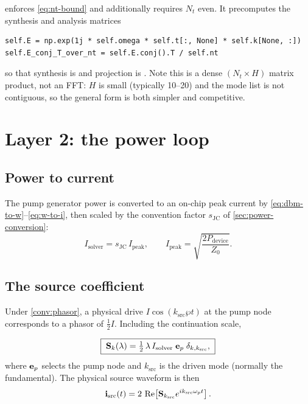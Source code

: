 \begin{implnote}
 enforces \eqref{eq:nt-bound} and additionally requires
$N_t$ even. It precomputes the synthesis and analysis matrices
\begin{lstlisting}
self.E = np.exp(1j * self.omega * self.t[:, None] * self.k[None, :])
self.E_conj_T_over_nt = self.E.conj().T / self.nt
\end{lstlisting}
so that synthesis is  and projection is
. Note this is a dense
$(N_t\times H)$ matrix product, not an FFT: $H$ is small (typically 10--20) and
the mode list is not contiguous, so the general form is both simpler and
competitive.
\end{implnote}

\section{Layer 2: the power loop}
\label{sec:power-loop}

\subsection{Power to current}

The pump generator power is converted to an on-chip peak current by
\eqref{eq:dbm-to-w}--\eqref{eq:w-to-i}, then scaled by the convention factor
$s_{\mathrm{JC}}$ of \cref{sec:power-conversion}:
\begin{equation}
  I_{\mathrm{solver}} = s_{\mathrm{JC}}\,I_{\mathrm{peak}},
  \qquad
  I_{\mathrm{peak}} = \sqrt{\frac{2P_{\mathrm{device}}}{Z_0}} .
\end{equation}

\subsection{The source coefficient}

Under \cref{conv:phasor}, a physical drive $I\cos(k_{\mathrm{src}}\wp t)$ at the
pump node corresponds to a phasor of $\tfrac12 I$. Including the continuation
scale,

\begin{equation}
  \boxed{\;
  \mathbf{S}_k(\lambda)
  = \tfrac{1}{2}\,\lambda\,I_{\mathrm{solver}}\;
    \mathbf{e}_{p}\;\delta_{k,k_{\mathrm{src}}},
  \;}
  \label{eq:source-coeff}
\end{equation}
where $\mathbf{e}_p$ selects the pump node and $k_{\mathrm{src}}$ is the driven
mode (normally the fundamental). The physical source waveform is then
\begin{equation}
  \mathbf{i}_{\mathrm{src}}(t) = 2\,\operatorname{Re}\!\left[\mathbf{S}_{k_{\mathrm{src}}}
             e^{ik_{\mathrm{src}}\omega_{p} t}\right].
  \label{eq:source-time}
\end{equation}

